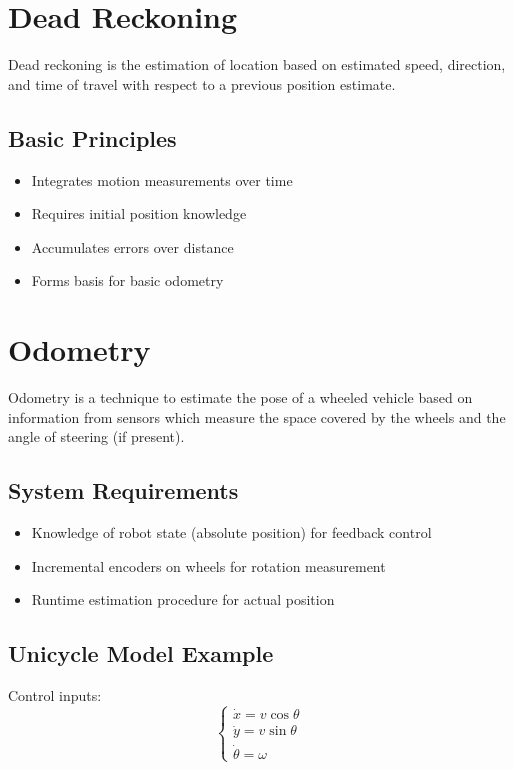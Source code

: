 \documentclass[openany]{book}
\theoremstyle{definition}
\theoremstyle{remark}
\newcommand{\definitionbox}[1]{
\begin{tcolorbox}[colback=blue!5,colframe=blue!40!black,title=Definition]
 #1
\end{tcolorbox}
}
\begin{document}
\section{Dead Reckoning}

\definitionbox{Dead reckoning is the estimation of location based on estimated speed, direction, and time of travel with respect to a previous position estimate.}

\subsection{Basic Principles}
\begin{itemize}
   \item Integrates motion measurements over time
   \item Requires initial position knowledge
   \item Accumulates errors over distance
   \item Forms basis for basic odometry
\end{itemize}

\section{Odometry}

\definitionbox{Odometry is a technique to estimate the pose of a wheeled vehicle based on information from sensors which measure the space covered by the wheels and the angle of steering (if present).}

\subsection{System Requirements}
\begin{itemize}
   \item Knowledge of robot state (absolute position) for feedback control
   \item Incremental encoders on wheels for rotation measurement
   \item Runtime estimation procedure for actual position
\end{itemize}

\subsection{Unicycle Model Example}
Control inputs:
\begin{equation}
\begin{cases}
\dot{x} = v \cos \theta \\
\dot{y} = v \sin \theta \\
\dot{\theta} = \omega
\end{cases}
\end{equation}
\end{document}
